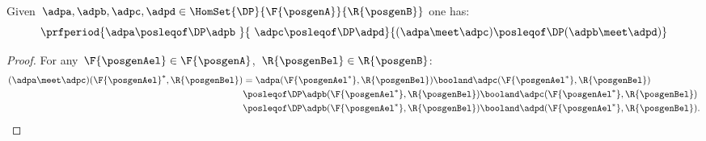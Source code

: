 \begin{lemma}
    \label{lem:intersection_mon}
    Given~$\adpa,\adpb,\adpc,\adpd \in \HomSet{\DP}{\F{\posgenA}}{\R{\posgenB}}$ one has:
    \begin{equation*}
        \prfperiod{\adpa\posleqof\DP \adpb\ }{\ \adpc\posleqof\DP \adpd}{(\adpa\meet \adpc)\posleqof\DP (\adpb\meet \adpd)}
    \end{equation*}
\end{lemma}
\begin{proof}
    For any~$\F{\posgenAel}\in \F{\posgenA}$,~$\R{\posgenBel}\in \R{\posgenB}$:
    \begin{equation*}
        \begin{aligned}
            (\adpa \meet \adpc)(\F{\posgenAel}^*,\R{\posgenBel})
             & =\adpa(\F{\posgenAel^*},\R{\posgenBel})\booland \adpc(\F{\posgenAel^*},\R{\posgenBel})              \\
             & \posleqof\DP \adpb(\F{\posgenAel^*},\R{\posgenBel})\booland \adpc(\F{\posgenAel^*},\R{\posgenBel})  \\
             & \posleqof\DP \adpb(\F{\posgenAel^*},\R{\posgenBel})\booland \adpd(\F{\posgenAel^*},\R{\posgenBel}).
        \end{aligned}
    \end{equation*}
\end{proof}
